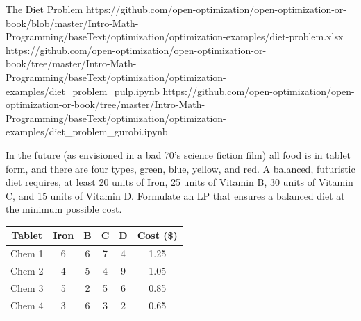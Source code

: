 \begin{examplewithallcode}{The Diet Problem}
{https://github.com/open-optimization/open-optimization-or-book/blob/master/Intro-Math-Programming/baseText/optimization/optimization-examples/diet-problem.xlsx}
{https://github.com/open-optimization/open-optimization-or-book/tree/master/Intro-Math-Programming/baseText/optimization/optimization-examples/diet_problem_pulp.ipynb}
{https://github.com/open-optimization/open-optimization-or-book/tree/master/Intro-Math-Programming/baseText/optimization/optimization-examples/diet_problem_gurobi.ipynb}


In the future (as envisioned in a bad 70's science fiction film) all food is in tablet form, and there are four types, green, blue, yellow, and red. A balanced, futuristic diet requires, at least 20 units of Iron, 25 units of Vitamin B, 30 units of Vitamin C, and 15 units of Vitamin D. Formulate an LP that ensures a balanced diet at the minimum possible cost.
\end{examplewithallcode}

\begin{table}[h!]
\begin{center}
\label{tab:pillContent}
\begin{tabular}{|c|c|c|c|c|c|}
\hline
Tablet & Iron & B & C & D & Cost (\$) \\ \hline
Chem 1 & 6 & 6 & 7 & 4 & 1.25 \\
Chem 2 & 4 & 5 & 4 & 9 & 1.05 \\
Chem 3 & 5 & 2 & 5 & 6 & 0.85 \\
Chem 4 & 3 & 6 & 3 & 2 & 0.65 \\
\hline
\end{tabular}
\end{center}
\end{table}

